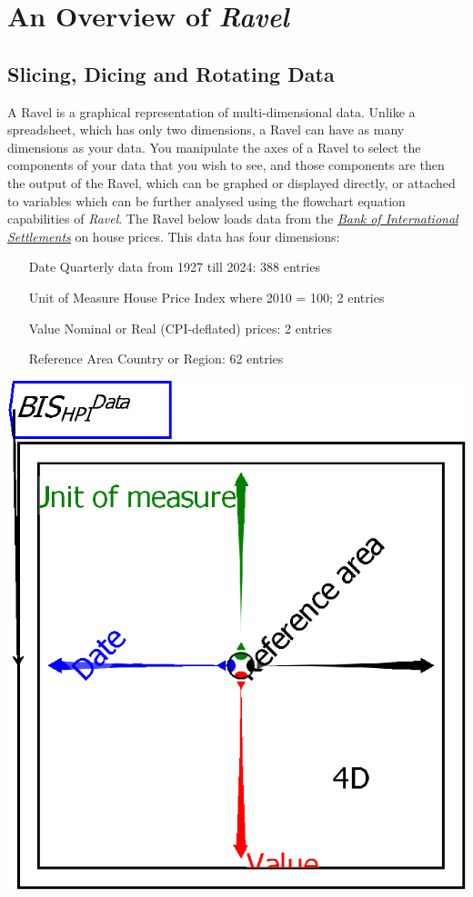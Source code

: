 
\chapter{An Overview of \emph{Ravel}}

\label{tutorial}

\section{Slicing, Dicing and Rotating Data}

A Ravel is a graphical representation of multi-dimensional data. Unlike
a spreadsheet, which has only two dimensions, a Ravel can have as
many dimensions as your data. You manipulate the axes of a Ravel to
select the components of your data that you wish to see, and those
components are then the output of the Ravel, which can be graphed
or displayed directly, or attached to variables which can be further
analysed using the flowchart equation capabilities of \emph{Ravel}.
The Ravel below loads data from the \emph{\href{https://data.bis.org/bulkdownload}{Bank of International Settlements}}
on house prices. This data has four dimensions:
\begin{enumerate}
\item[Date] Quarterly data from 1927 till 2024: 388 entries 
\item[Unit of Measure] House Price Index where 2010 = 100; 2 entries 
\item[Value] Nominal or Real (CPI-deflated) prices: 2 entries 
\item[Reference Area] Country or Region: 62 entries 
\end{enumerate}
\includegraphics{images/tut00Ravel}

